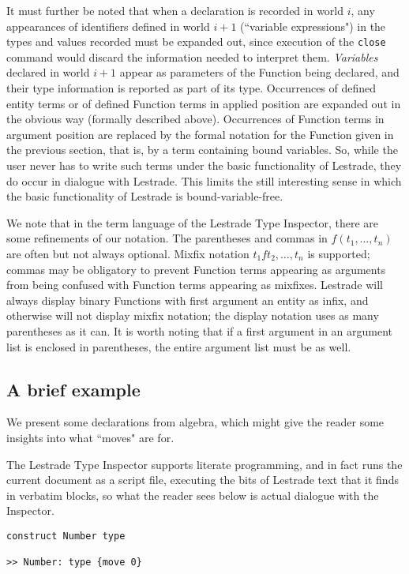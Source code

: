 \documentclass{article}
\begin{document}
It must further be noted that when a declaration is recorded in world $i$, any appearances of identifiers defined in world $i+1$ (``variable expressions") in the types and values recorded must be expanded out, since
execution of the {\tt close} command would discard the information needed to interpret them.  {\em Variables\/} declared in world $i+1$ appear as parameters of the Function being declared, and their type information is reported as part of its type.   Occurrences of defined entity terms or of defined Function terms in applied position are expanded out in the obvious way (formally described above).   Occurrences of Function terms in argument position are replaced by the formal notation for the Function given in the previous section, that is, by a term containing bound variables.  So, while the user never has to write such terms under the basic functionality of Lestrade, they do occur in dialogue with Lestrade.  This limits the still interesting sense in which the basic functionality of Lestrade is bound-variable-free.

We note that in the term language of the Lestrade Type Inspector, there are some refinements of our notation.  The parentheses and commas in $f(t_1,\ldots,t_n)$ are often but not always optional.  Mixfix notation $t_1 f t_2,\ldots,t_n$ is supported; commas may be obligatory to prevent Function terms appearing as arguments from being confused with Function terms appearing as mixfixes.  Lestrade will always display binary Functions with first argument an entity as infix, and otherwise will not display mixfix notation;  the display notation uses as many parentheses as it can.  It is worth noting that if a first argument in an argument list is enclosed in parentheses, the entire argument list must be as well.


\subsection{A brief example}

We present some declarations from algebra, which might give the reader some insights into what ``moves" are for.

The Lestrade Type Inspector supports literate programming, and in fact runs the current document as a script file, executing the bits of Lestrade text that it finds in verbatim blocks, so what the reader sees below is actual dialogue with the Inspector.

\begin{verbatim}
construct Number type

>> Number: type {move 0}


\end{verbatim}
\end{document}

